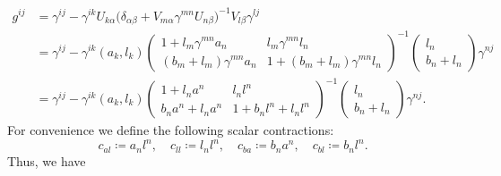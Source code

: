 \documentclass{article}
\begin{document}
\begin{align*}
    g^{ij} 
    &= \gamma^{ij} - \gamma^{ik} U_{k\alpha} \Big(\delta_{\alpha\beta} + V_{m\alpha} \gamma^{mn} U_{n\beta}\Big)^{-1} V_{l\beta} \gamma^{lj} \\
    &= \gamma^{ij} - \gamma^{ik} (a_k, l_k) \begin{pmatrix}
            1 + l_m \gamma^{mn} a_n & l_m \gamma^{mn} l_n \\
            (b_m + l_m) \gamma^{mn} a_n & 1 + (b_m + l_m) \gamma^{mn} l_n
       \end{pmatrix}^{-1} \begin{pmatrix} l_n \\ b_n + l_n \end{pmatrix} \gamma^{nj} \\
    &= \gamma^{ij} - \gamma^{ik} (a_k, l_k) \begin{pmatrix}
            1 + l_n a^n & l_n l^n \\
            b_n a^n + l_n a^n & 1 + b_n l^n + l_n l^n
       \end{pmatrix}^{-1} \begin{pmatrix} l_n \\ b_n + l_n \end{pmatrix} \gamma^{nj}.
\end{align*} 
For convenience we define the following scalar contractions: $$
    c_{al} \coloneqq a_n l^n,\quad
    c_{ll} \coloneqq l_n l^n,\quad
    c_{ba} \coloneqq b_n a^n,\quad
    c_{bl} \coloneqq b_n l^n.
$$ Thus, we have
\end{document}
